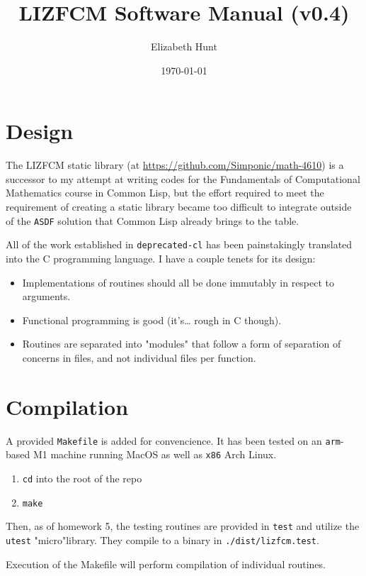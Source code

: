 \documentclass[11pt]{article}
\author{Elizabeth Hunt}
\date{\today}
\title{LIZFCM Software Manual (v0.4)}
\begin{document}
\maketitle
\tableofcontents

\setlength\parindent{0pt}
\section{Design}
\label{sec:org138ae3c}
The LIZFCM static library (at \url{https://github.com/Simponic/math-4610}) is a successor to my
attempt at writing codes for the Fundamentals of Computational Mathematics course in Common
Lisp, but the effort required to meet the requirement of creating a static library became
too difficult to integrate outside of the \texttt{ASDF} solution that Common Lisp already brings
to the table.

All of the work established in \texttt{deprecated-cl} has been painstakingly translated into
the C programming language. I have a couple tenets for its design:

\begin{itemize}
\item Implementations of routines should all be done immutably in respect to arguments.
\item Functional programming is good (it's\ldots{} rough in C though).
\item Routines are separated into "modules" that follow a form of separation of concerns
in files, and not individual files per function.
\end{itemize}
\section{Compilation}
\label{sec:orge986ff9}
A provided \texttt{Makefile} is added for convencience. It has been tested on an \texttt{arm}-based M1 machine running
MacOS as well as \texttt{x86} Arch Linux.

\begin{enumerate}
\item \texttt{cd} into the root of the repo
\item \texttt{make}
\end{enumerate}

Then, as of homework 5, the testing routines are provided in \texttt{test} and utilize the
\texttt{utest} "micro"library. They compile to a binary in \texttt{./dist/lizfcm.test}.

Execution of the Makefile will perform compilation of individual routines.
\end{document}
